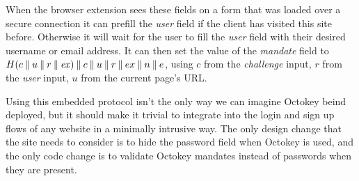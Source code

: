 When the browser extension sees these fields on a form that was loaded over a secure connection it can
prefill the \emph{user} field if the client has visited this site before. Otherwise it will wait for the user to fill
the \emph{user} field with their desired username or email address. It can then set the value of the \emph{mandate}
field to $ H(c \mathbin{\|} u \mathbin{\|} r \mathbin{\|} \mathit{ex}) \mathbin{\|} c \mathbin{\|} u \mathbin{\|} r \mathbin{\|} ex \mathbin{\|} n \mathbin{\|} e $,
using $c$ from the \emph{challenge} input, $r$ from the \emph{user} input, $u$ from the current page's URL.

Using this embedded protocol isn't the only way we can imagine Octokey beind deployed, but it should make it
trivial to integrate into the login and sign up flows of any website in a minimally intrusive way. The only design
change that the site needs to consider is to hide the password field when Octokey is used, and the only code change
is to validate Octokey mandates instead of passwords when they are present.

